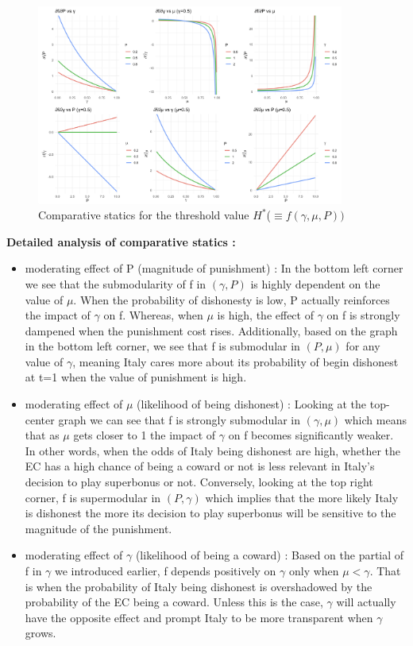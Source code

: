 \documentclass{article}
\begin{document}
\begin{figure}[H]  
    \centering  
    \includegraphics[width=0.9\textwidth]{Graphs/MCS.png}  
    \caption{Comparative statics for the threshold value $H^*$($\equiv f(\gamma,\mu,P))$}  
\end{figure} 
\textbf{Detailed analysis of comparative statics : }
\begin{itemize}
    \item moderating effect of P (magnitude of punishment) : In the bottom left corner we see that the submodularity of f in $(\gamma,P)$ is highly dependent on the value of $\mu$. When the probability of dishonesty is low, P actually reinforces the impact of $\gamma$ on f. Whereas, when $\mu$ is high, the effect of $\gamma$ on f is strongly dampened when the punishment cost rises. Additionally, based on the graph in the bottom left corner, we see that f is submodular in $(P,\mu)$ for any value of $\gamma$, meaning Italy cares more about its probability of begin dishonest at t=1 when the value of punishment is high.  
    \item moderating effect of $\mu$ (likelihood of being dishonest) : Looking at the top-center graph we can see that f is strongly submodular in $(\gamma,\mu)$ which means that as $\mu$ gets closer to 1 the impact of $\gamma$ on f becomes significantly weaker. In other words, when the odds of Italy being dishonest are high, whether the EC has a high chance of being a coward or not is less relevant in Italy's decision to play superbonus or not. Conversely, looking at the top right corner, f is supermodular in $(P,\gamma)$ which implies that the more likely Italy is dishonest the more its decision to play superbonus will be sensitive to the magnitude of the punishment. 
    \item moderating effect of $\gamma$ (likelihood of being a coward) : Based on the partial of f in $\gamma$ we introduced earlier, f depends positively on $\gamma$ only when $\mu<\gamma$. That is when the probability of Italy being dishonest is overshadowed by the probability of the EC being a coward. Unless this is the case, $\gamma$ will actually have the opposite effect and prompt Italy to be more transparent when $\gamma$ grows. 
\end{itemize}
\end{document}
